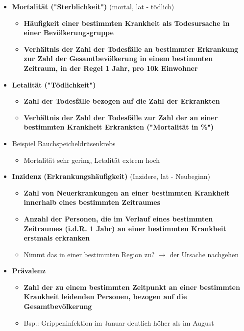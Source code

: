 \begin{itemize}
\begin{itemize}
			\end{itemize}
		\item \textbf{Mortalität ("Sterblichkeit")} (mortal, lat - tödlich)
			\begin{itemize}
				\item \textbf{Häufigkeit einer bestimmten Krankheit als Todesursache in einer Bevölkerungsgruppe}
				\item \textbf{Verhältnis der Zahl der Todesfälle an bestimmter Erkrankung zur Zahl der Gesamtbevölkerung in einem bestimmten Zeitraum, in der Regel 1 Jahr, pro 10k Einwohner}
			\end{itemize}
	\pagebreak
		\item \textbf{Letalität ("Tödlichkeit")}
			\begin{itemize}
				\item \textbf{Zahl der Todesfälle bezogen auf die Zahl der Erkrankten}
				\item \textbf{Verhältnis der Zahl der Todesfälle zur Zahl der an einer bestimmten Krankheit Erkrankten ("Mortalität in \%")}
			\end{itemize}
		\item Beispiel Bauchspeicheldrüsenkrebs
			\begin{itemize}
				\item Mortalität sehr gering, Letalität extrem hoch
			\end{itemize}
		\item \textbf{Inzidenz (Erkrankungshäufigkeit)} (Inzidere, lat - Neubeginn)
			\begin{itemize}
				\item \textbf{Zahl von Neuerkrankungen an einer bestimmten Krankheit innerhalb eines bestimmten Zeitraumes}
				\item \textbf{Anzahl der Personen, die im Verlauf eines bestimmten Zeitraumes (i.d.R. 1 Jahr) an einer bestimmten Krankheit erstmals erkranken}
				\item Nimmt das in einer bestimmten Region zu? $\rightarrow$ der Ursache nachgehen
			\end{itemize}
		\item \textbf{Prävalenz}
			\begin{itemize}
				\item \textbf{Zahl der zu einem bestimmten Zeitpunkt an einer bestimmten Krankheit leidenden Personen, bezogen auf die Gesamtbevölkerung}
				\item Bsp.: Grippeninfektion im Januar deutlich höher als im August
			\end{itemize}
	\end{itemize}

